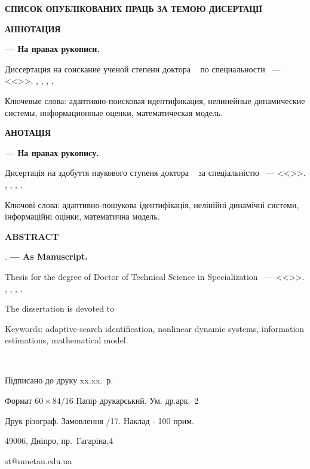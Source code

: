 \documentclass[a4paper,12pt]{atuaref}
\newcommand{\xsect}[1]{\medskip\begin{center}\textbf{#1}\end{center}\medskip\penalty10000}
\begin{document}
\xsect{СПИСОК ОПУБЛІКОВАНИХ ПРАЦЬ ЗА ТЕМОЮ ДИСЕРТАЦІЇ}

\nocite{*}

\printbibliography[heading=none]




\xsect{АННОТАЦИЯ}

\textbf{\dissauthorRu}
\textbf{\booknameRu}
\textbf{--- На правах рукописи.}

Диссертация на соискание ученой степени
доктора
\dissScopeRu\ {}
по специальности
\dissSpecId\ --- <<\dissSpecRu>>.
\institutionRu, \belongRu, \cityRu, \bookyear.


Ключевые слова:
адаптивно-поисковая идентификация, нелинейные динамические системы,
информационные оценки, математическая модель.


\xsect{АНОТАЦІЯ}

\textbf{\dissauthorUa}
\textbf{\booknameUa}
\textbf{--- На правах рукопису.}

Дисертація на здобуття наукового ступеня
доктора
\dissScopeUa\ {}
за спеціальністю
\dissSpecId\ --- <<\dissSpecUa>>.
\institutionUa, \belongUa, \cityUa, \bookyear.


Ключові слова: адаптивно-пошукова ідентифікація, нелінійні динамічні
системи, інформаційні оцінки, математична модель.



\xsect{ABSTRACT}

\textbf{\dissauthorEn}
\textbf{\booknameEn}.
\textbf{--- As Manuscript.}

Thesis for the degree of Doctor of Technical Science in Specialization
\dissSpecId\ --- <<\dissSpecEn>>.
\institutionEn, \belongEn, \cityEn, \bookyear.

The dissertation is devoted to

Keywords: adaptive-search identification, nonlinear dynamic systems,
information estimations, mathematical model.

\clearpage

{~}
\vfill

\begin{center}


Підписано до друку xx.xx.\bookyear~р.

Формат $60 \times 84/16$  Папір друкарський. Ум. др.арк.~2

Друк різограф. Замовлення /17. Наклад - 100 прим.


49006, Дніпро, пр.~Гагаріна,4

st@nmetau.edu.ua

\end{center}

\vfill
\end{document}
